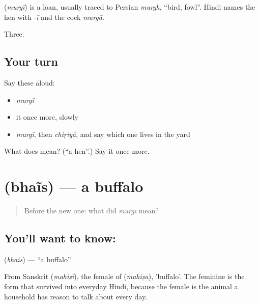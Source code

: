 \begin{cousinweb}
\textbf{} (\emph{murgī}) is a loan, usually traced to Persian \emph{murgh}, \textquotedblleft{}bird, fowl\textquotedblright{}. Hindi names the hen with \emph{-ī} and the cock \emph{murgā}.
\end{cousinweb}

\begin{grammarlens}[title={What you've built}]
Three.
\end{grammarlens}

\subsection*{Your turn}
Say these aloud:

\begin{itemize}
\raggedright
  \item \emph{murgī}
  \item it once more, slowly
  \item \emph{murgī}, then \emph{chiṛiyā}, and say which one lives in the yard
\end{itemize}

\begin{tcolorbox}[breakable,colback=teal!4,colframe=teal!35!black,title={Before you move on}]
What does  mean? (\textquotedblleft{}a hen\textquotedblright{}.) Say it once more.
\end{tcolorbox}
\section[\texorpdfstring{\hi{भैंस} (bhaĩs)}{भैंस (bhaĩs)}]{ (bhaĩs) — a buffalo}

\label{lesson:HI-C60-buffalo}



\begin{quote}
Before the new one: what did \emph{murgī} mean?
\end{quote}

\subsection*{You'll want to know: }
\textbf{} (\emph{bhaĩs}) — \textquotedblleft{}a buffalo\textquotedblright{}.

From Sanskrit  (\emph{mahiṣī}), the female of  (\emph{mahiṣa}), 'buffalo'. The feminine is the form that survived into everyday Hindi, because the female is the animal a household has reason to talk about every day.

